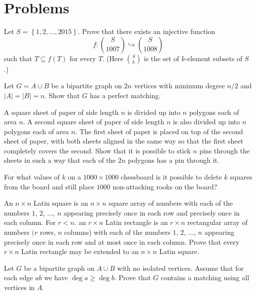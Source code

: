 \documentclass[11pt]{article}
\begin{document}
\section{Problems}

\begin{problem}
	Let $S = \left\{ 1,2,\dots,2015 \right\}$.
Prove that there exists an injective function \[ f : \binom{S}{1007} \hookrightarrow \binom{S}{1008} \]
such that $T \subseteq f(T)$ for every $T$.
(Here $\binom Sk$ is the set of $k$-element subsets of $S$.)
\end{problem}

\begin{problem}
	Let $G = A \cup B$ be a bipartite graph on $2n$ vertices
	with minimum degree $n/2$ and $|A|=|B|=n$.
	Show that $G$ has a perfect matching.
\end{problem}

\begin{problem}
	A square sheet of paper of side length $n$ is divided up into $n$ polygons each of area $n$. A second square sheet of paper of side length $n$ is also divided up into $n$ polygons each of area $n$. The first sheet of paper is placed on top of the second sheet of paper, with both sheets aligned in the same way so that the first sheet completely covers the second. Show that it is possible to stick $n$ pins through the sheets in such a way that each of the $2 n$ polygons has a pin through it.
\end{problem}

\begin{problem}
	For what values of $k$ on a $1000 \times 1000$ chessboard is it possible to delete $k$ squares from the board and still place $1000$ non-attacking rooks on the board?
\end{problem}


\begin{problem}
	An $n \times n$ Latin square is an $n \times n$ square array of numbers with each of the numbers $1$, $2$, $\ldots$, $n$ appearing precisely once in each row and precisely once in each column. For $r<n$. an $r \times n$ Latin rectangle is an $r \times n$ rectangular array of numbers $(r$ rows, $n$ columns) with each of the numbers $1$, $2$, $\ldots$, $n$ appearing precisely once in each row and at most once in each column. Prove that every $r \times n$ Latin rectangle may be extended to an $n \times n$ Latin
	square.
\end{problem}

\begin{problem}
	Let $G$ be a bipartite graph on $A \cup B$ with no isolated vertices.
Assume that for each edge $ab$ we have $\deg a \geq \deg b$.
Prove that $G$ contains a matching using all vertices in $A$.
\end{problem}
\end{document}
